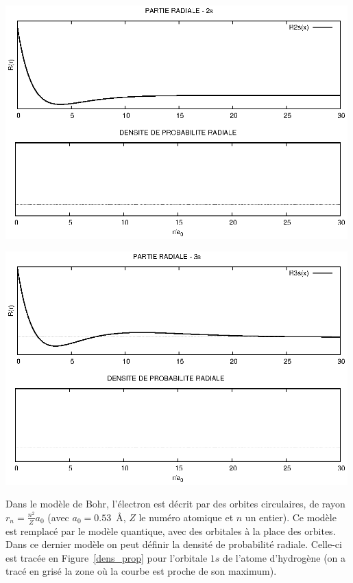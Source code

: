 \begin{center}
\includegraphics[angle=90,width=0.99\textwidth]{figure/rad2s.eps}
\end{center}

\begin{center}
\includegraphics[angle=90,width=0.99\textwidth]{figure/rad3s.eps}
\end{center}


Dans le mod\`ele de Bohr, l'\'electron est d\'ecrit par des orbites circulaires, 
de rayon $r_n= \frac{n^2}{Z} a_0$ (avec $a_0=0.53$~\AA, $Z$ le num\'ero
atomique et $n$ un entier).
Ce mod\`ele est remplac\'e par le mod\`ele quantique, avec des orbitales \`a la place des orbites. Dans ce dernier
mod\`ele on peut d\'efinir la densit\'e de probabilit\'e radiale. Celle-ci est trac\'ee en Figure~\ref{dens_prop} 
pour l'orbitale 
$1s$ de l'atome d'hydrog\`ene (on a trac\'e en gris\'e la zone o\`u la courbe est proche de son maximum).

